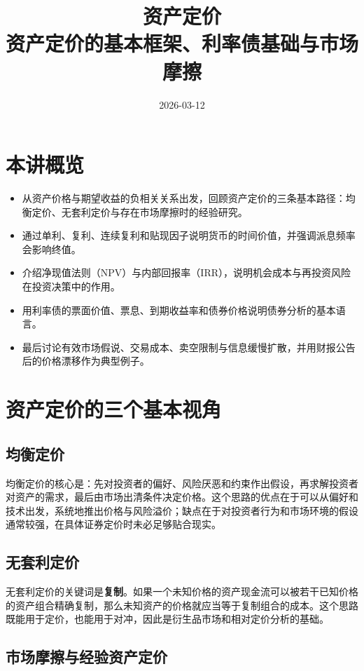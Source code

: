 \documentclass[UTF8,11pt,a4paper]{ctexart}
\title{ 资产定价 \\ \large 资产定价的基本框架、利率债基础与市场摩擦 }
\author{}
\date{2026-03-12}
\begin{document}
\maketitle

\section{本讲概览}

\begin{itemize}
  \item 从资产价格与期望收益的负相关关系出发，回顾资产定价的三条基本路径：均衡定价、无套利定价与存在市场摩擦时的经验研究。
  \item 通过单利、复利、连续复利和贴现因子说明货币的时间价值，并强调派息频率会影响终值。
  \item 介绍净现值法则（NPV）与内部回报率（IRR），说明机会成本与再投资风险在投资决策中的作用。
  \item 用利率债的票面价值、票息、到期收益率和债券价格说明债券分析的基本语言。
  \item 最后讨论有效市场假说、交易成本、卖空限制与信息缓慢扩散，并用财报公告后的价格漂移作为典型例子。
\end{itemize}

\section{资产定价的三个基本视角}

\subsection{均衡定价}

均衡定价的核心是：先对投资者的偏好、风险厌恶和约束作出假设，再求解投资者对资产的需求，最后由市场出清条件决定价格。这个思路的优点在于可以从偏好和技术出发，系统地推出价格与风险溢价；缺点在于对投资者行为和市场环境的假设通常较强，在具体证券定价时未必足够贴合现实。

\subsection{无套利定价}

无套利定价的关键词是\textbf{复制}。如果一个未知价格的资产现金流可以被若干已知价格的资产组合精确复制，那么未知资产的价格就应当等于复制组合的成本。这个思路既能用于定价，也能用于对冲，因此是衍生品市场和相对定价分析的基础。

\subsection{市场摩擦与经验资产定价}
\end{document}

